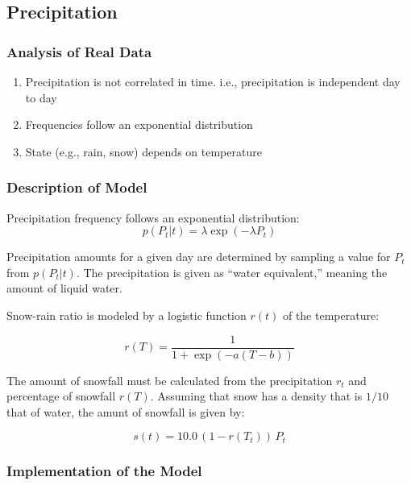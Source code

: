 \documentclass[11pt, letterpaper]{article}
\begin{document}
\subsection{Precipitation}

\subsubsection{Analysis of Real Data}

\begin{enumerate}
\item Precipitation is not correlated in time.  i.e., precipitation is independent day to day
\item Frequencies follow an exponential distribution
\item State (e.g., rain, snow) depends on temperature
\end{enumerate}

\subsubsection{Description of Model}

Precipitation frequency follows an exponential distribution:
\begin{equation}
p(P_t | t) = \lambda \exp(-\lambda P_t)
\end{equation}

Precipitation amounts for a given day are determined by sampling a value for $P_t$ from $p(P_t | t)$.  The precipitation is given as ``water equivalent,'' meaning the amount of liquid water.

Snow-rain ratio is modeled by a logistic function $r(t)$ of the temperature:

\begin{equation}
r(T) = \frac{1}{1 + \exp(-a (T - b))}
\end{equation}

The amount of snowfall must be calculated from the precipitation $r_t$ and percentage of snowfall $r(T)$.  Assuming that snow has a density that is $1/10$ that of water, the amunt of snowfall is given by:

\begin{equation}
s(t) = 10.0 \, (1 - r(T_t)) \, P_t
\end{equation}

\subsubsection{Implementation of the Model}
\end{document}
